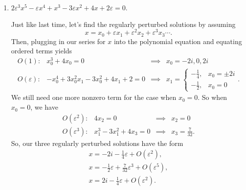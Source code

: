 \documentclass[a4paper,12pt]{article}
\newcommand{\eps}{\varepsilon}
\begin{document}
\begin{enumerate}[label = \arabic*)]
\begin{enumerate}[label = (\alph*)]
        \newpage
        \item $ 2 \eps^3 x^5 - \eps x^4 + x^3 - 3 \eps x^2 + 4x + 2 \eps = 0 $.
        
        Just like last time, let's find the regularly perturbed solutions by assuming
        \[
        	x = x_0 + \eps x_1 + \eps^2 x_2 + \eps^3 x_3\cdots.
        \]
        Then, plugging in our series for $ x $ into the polynomial equation and equating ordered terms yields
        \[
        	\begin{array}{rccl}
        		O(1): & x_0^3 + 4x_0 = 0 & \implies & x_0 = -2i, 0, 2i \\
        		O(\eps): & -x_0^4 + 3x_0^2x_1 - 3x_0^2 + 4x_1 + 2 = 0 & \implies & x_1 = 
        		\begin{cases}
        			-\frac{1}{4}, & x_0 = \pm 2i \\
        			-\frac{1}{2}, & x_0 = 0
        		\end{cases}.
        	\end{array}
        \]
        We still need one more nonzero term for the case when $ x_0 = 0 $. So when $ x_0 = 0 $, we have
        \[
        	\begin{array}{rccl}
        		O(\eps^2): & 4x_2 = 0 & \implies & x_2 = 0 \\
        		O(\eps^3): & x_1^3 -3 x_1^2 + 4 x_3 = 0 & \implies & x_3 = \frac{7}{32}.
        	\end{array}
        \]
        So, our three regularly perturbed solutions have the form
        \[
	        \boxed{\begin{array}{l}
	        	x = -2i - \frac{1}{4} \eps + O(\eps^2), \\
	        	x = -\frac{1}{2} \eps + \frac{7}{32} \eps^3 + O(\eps^5), \\
	        	x = 2i -  \frac{1}{4} \eps + O(\eps^2).
	        \end{array}}
    	\]
    	

\end{enumerate}
\end{enumerate}
\end{document}
